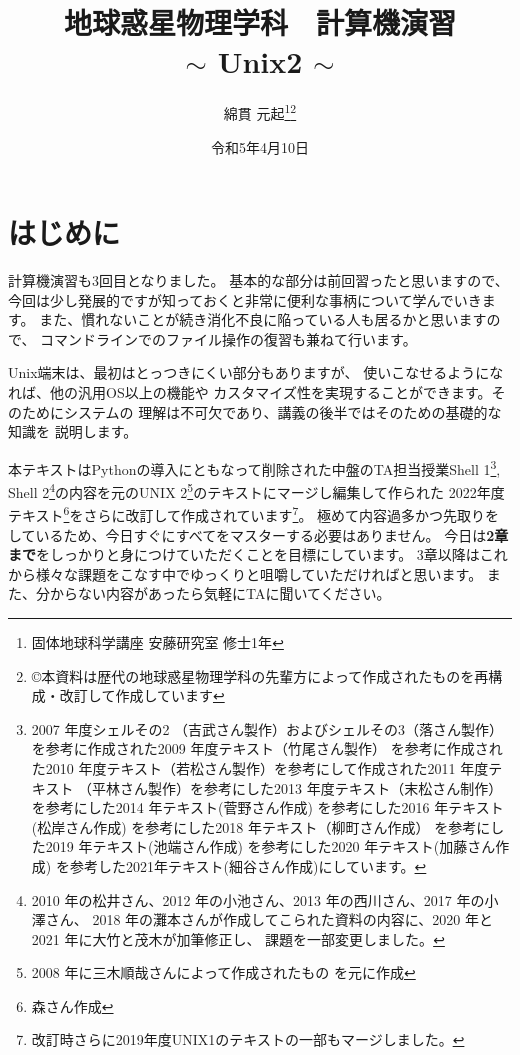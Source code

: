 \documentclass[a4j]{ltjreport}
\title{\textbf{地球惑星物理学科　計算機演習}\\
$\sim$ Unix2 $\sim$}
\author{綿貫 元起\thanks{固体地球科学講座 安藤研究室 修士1年}\footnote{\copyright 本資料は歴代の地球惑星物理学科の先輩方によって作成されたものを再構成・改訂して作成しています}}
\date{令和5年4月10日}
\begin{document}
    \maketitle

    \chapter*{はじめに}
    計算機演習も3回目となりました。
    基本的な部分は前回習ったと思いますので、
    今回は少し発展的ですが知っておくと非常に便利な事柄について学んでいきます。
    また、慣れないことが続き消化不良に陥っている人も居るかと思いますので、
    コマンドラインでのファイル操作の復習も兼ねて行います。

    Unix端末は、最初はとっつきにくい部分もありますが、
    使いこなせるようになれば、他の汎用OS以上の機能や
    カスタマイズ性を実現することができます。そのためにシステムの
    理解は不可欠であり、講義の後半ではそのための基礎的な知識を
    説明します。

    本テキストはPythonの導入にともなって削除された中盤のTA担当授業Shell 1\footnote{2007 年度シェルその2
    （吉武さん製作）およびシェルその3（落さん製作）を参考に作成された2009 年度テキスト（竹尾さん製作）
    を参考に作成された2010 年度テキスト（若松さん製作）を参考にして作成された2011 年度テキスト
    （平林さん製作）を参考にした2013 年度テキスト（末松さん制作）を参考にした2014 年テキスト(菅野さん作成)
    を参考にした2016 年テキスト(松岸さん作成) を参考にした2018 年テキスト（柳町さん作成）
    を参考にした2019 年テキスト(池端さん作成) を参考にした2020 年テキスト(加藤さん作成) 
    を参考した2021年テキスト(細谷さん作成)にしています。}, 
    Shell 2\footnote{2010 年の松井さん、2012 年の小池さん、2013 年の西川さん、2017 年の小澤さん、
    2018 年の灘本さんが作成してこられた資料の内容に、2020 年と2021 年に大竹と茂木が加筆修正し、
    課題を一部変更しました。}の内容を元のUNIX 2\footnote{2008 年に三木順哉さんによって作成されたもの
    を元に作成}のテキストにマージし編集して作られた
    2022年度テキスト\footnote{森さん作成}をさらに改訂して作成されています\footnote{改訂時さらに2019年度UNIX1のテキストの一部もマージしました。}。
    極めて内容過多かつ先取りをしているため、今日すぐにすべてをマスターする必要はありません。
    今日は\textbf{2章まで}をしっかりと身につけていただくことを目標にしています。
    3章以降はこれから様々な課題をこなす中でゆっくりと咀嚼していただければと思います。
    また、分からない内容があったら気軽にTAに聞いてください。
\end{document}
